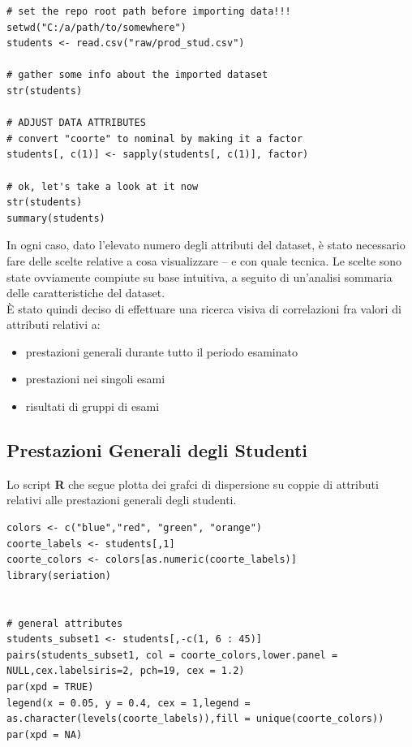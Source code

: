 \newpage

\begin{lstlisting}
# set the repo root path before importing data!!!
setwd("C:/a/path/to/somewhere")
students <- read.csv("raw/prod_stud.csv")

# gather some info about the imported dataset
str(students)

# ADJUST DATA ATTRIBUTES 
# convert "coorte" to nominal by making it a factor 
students[, c(1)] <- sapply(students[, c(1)], factor)

# ok, let's take a look at it now
str(students)
summary(students)
\end{lstlisting}

In ogni caso, dato l’elevato numero degli attributi del dataset, è stato necessario fare delle scelte relative a cosa visualizzare – e con quale tecnica. Le scelte sono state ovviamente compiute su base intuitiva, a seguito di un’analisi sommaria delle caratteristiche del dataset. \\

È stato quindi deciso di effettuare una ricerca visiva di correlazioni fra valori di attributi relativi a:
\begin{itemize}
    \item prestazioni generali durante tutto il periodo esaminato
    \item prestazioni nei singoli esami
    \item risultati di gruppi di esami
\end{itemize}

\subsection{Prestazioni Generali degli Studenti}

Lo script \textbf{R} che segue plotta dei grafci di dispersione su coppie di attributi relativi alle prestazioni generali degli studenti. \\

\begin{lstlisting}
colors <- c("blue","red", "green", "orange")
coorte_labels <- students[,1]
coorte_colors <- colors[as.numeric(coorte_labels)]
library(seriation)


# general attributes
students_subset1 <- students[,-c(1, 6 : 45)]
pairs(students_subset1, col = coorte_colors,lower.panel = 	NULL,cex.labelsiris=2, pch=19, cex = 1.2)
par(xpd = TRUE)
legend(x = 0.05, y = 0.4, cex = 1,legend = 	as.character(levels(coorte_labels)),fill = unique(coorte_colors))
par(xpd = NA)
\end{lstlisting}

